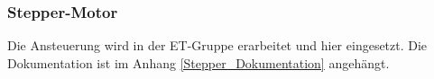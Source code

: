 \subsubsection{Stepper-Motor}
Die Ansteuerung wird in der ET-Gruppe erarbeitet und hier eingesetzt. Die Dokumentation ist im Anhang \ref{Stepper_Dokumentation} angehängt.